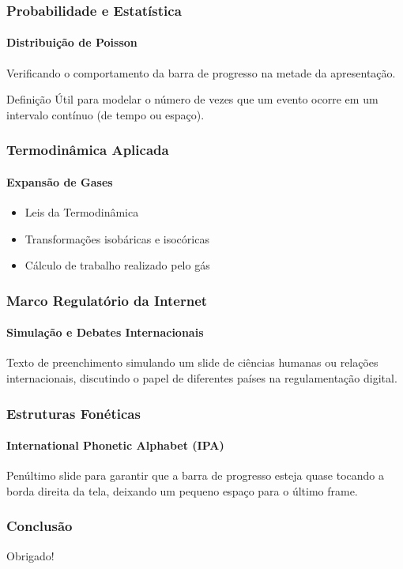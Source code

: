 \documentclass[aspectratio=169]{beamer}
\begin{document}
\begin{frame}
    \frametitle{Probabilidade e Estatística}
    \framesubtitle{Distribuição de Poisson}

    Verificando o comportamento da barra de progresso na metade da apresentação.
    \vspace{0.5cm}
    
    \begin{block}{Definição}
        Útil para modelar o número de vezes que um evento ocorre em um intervalo contínuo (de tempo ou espaço).
    \end{block}
\end{frame}

\begin{frame}
    \frametitle{Termodinâmica Aplicada}
    \framesubtitle{Expansão de Gases}

    \begin{itemize}
        \item Leis da Termodinâmica
        \item Transformações isobáricas e isocóricas
        \item Cálculo de trabalho realizado pelo gás
    \end{itemize}
\end{frame}

\begin{frame}
    \frametitle{Marco Regulatório da Internet}
    \framesubtitle{Simulação e Debates Internacionais}

    Texto de preenchimento simulando um slide de ciências humanas ou relações internacionais, discutindo o papel de diferentes países na regulamentação digital.
\end{frame}

\begin{frame}
    \frametitle{Estruturas Fonéticas}
    \framesubtitle{International Phonetic Alphabet (IPA)}

    Penúltimo slide para garantir que a barra de progresso esteja quase tocando a borda direita da tela, deixando um pequeno espaço para o último frame.
\end{frame}

\begin{frame}
    \frametitle{Conclusão}

    Obrigado!
\end{frame}
\end{document}
